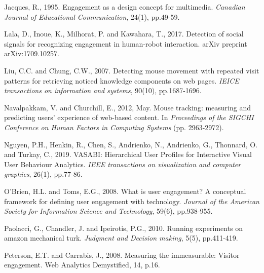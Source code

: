 \documentclass[12pt]{article}
\renewcommand{\_}{\kern-1.5pt\textunderscore\kern-1.5pt}
\begin{document}
\vspace{\baselineskip}
Jacques, R., 1995. Engagement as a design concept for multimedia. \textit{Canadian Journal of Educational Communication}, 24(1), pp.49-59.\par


\vspace{\baselineskip}
Lala, D., Inoue, K., Milhorat, P. and Kawahara, T., 2017. Detection of social signals for recognizing engagement in human-robot interaction. arXiv preprint arXiv:1709.10257.\par


\vspace{\baselineskip}
Liu, C.C. and Chung, C.W., 2007. Detecting mouse movement with repeated visit patterns for retrieving noticed knowledge components on web pages. \textit{IEICE transactions on information and systems}, 90(10), pp.1687-1696.\par


\vspace{\baselineskip}
Navalpakkam, V. and Churchill, E., 2012, May. Mouse tracking: measuring and predicting users' experience of web-based content. In \textit{Proceedings of the SIGCHI Conference on Human Factors in Computing Systems} (pp. 2963-2972).\par


\vspace{\baselineskip}
Nguyen, P.H., Henkin, R., Chen, S., Andrienko, N., Andrienko, G., Thonnard, O. and Turkay, C., 2019. VASABI: Hierarchical User Profiles for Interactive Visual User Behaviour Analytics. \textit{IEEE transactions on visualization and computer graphics}, 26(1), pp.77-86.\par


\vspace{\baselineskip}
O'Brien, H.L. and Toms, E.G., 2008. What is user engagement? A conceptual framework for defining user engagement with technology. \textit{Journal of the American Society for Information Science and Technology}, 59(6), pp.938-955.\par


\vspace{\baselineskip}
Paolacci, G., Chandler, J. and Ipeirotis, P.G., 2010. Running experiments on amazon mechanical turk. \textit{Judgment and Decision making}, 5(5), pp.411-419.\par


\vspace{\baselineskip}
Peterson, E.T. and Carrabis, J., 2008. Measuring the immeasurable: Visitor engagement. Web Analytics Demystified, 14, p.16.\par
\end{document}
